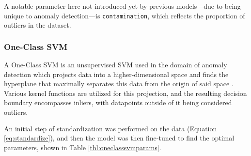\documentclass[12pt,a4paper]{article}
\numberwithin{figure}{section}
\numberwithin{table}{section}
\numberwithin{definition}{section}
\begin{document}
A notable parameter here not introduced yet by previous models---due to being unique to anomaly detection---is \texttt{contamination}, which reflects the proportion of outliers in the dataset.

\subsubsection{One-Class SVM}
\label{ssec:oneclasssvm}


A One-Class SVM is an unsupervised SVM used in the domain of anomaly detection which projects data into a higher-dimensional space and finds the hyperplane that maximally separates this data from the origin of said space \parencite{Boiar2022article}. Various kernel functions are utilized for this projection, and the resulting decision boundary encompasses inliers, with datapoints outside of it being considered outliers. 



An initial step of standardization was performed on the data (Equation \ref{eq:standardize}), and then the model was then fine-tuned to find the optimal parameters, shown in Table \ref{tbl:oneclasssvmparams}. 
\end{document}
